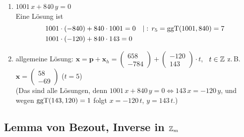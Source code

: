 \begin{loesung}
\begin{enumerate}
\item[(ii)] $1001\,x + 840\,y = 0$\\
Eine Lösung ist
\begin{align*}
&1001\cdot(-840) + 840\cdot 1001 = 0 \quad |:\, r_5 = \operatorname{ggT}(1001, 840) = 7\\
&1001\cdot(-120) + 840\cdot 143 = 0
\end{align*}
\item[(iii)] allgemeine Lösung: $\mathbf{x} = \mathbf{p} + \mathbf{x}_h = \begin{pmatrix}658\\-784\end{pmatrix} + \begin{pmatrix}-120\\143\end{pmatrix} \cdot t$, \ $t \in \mathbb{Z}$ \quad z.\,B. $\mathbf{x} = \begin{pmatrix}58\\-69\end{pmatrix}$ ($t = 5$)\\
(Das sind alle Lösungen, denn $1001\,x + 840\,y = 0 \Leftrightarrow 143\,x = -120\,y$, und wegen $\operatorname{ggT}(143, 120) = 1$ folgt $x = -120\,t$, $y = 143\,t$.)
\end{enumerate}
\end{loesung}

\subsection{Lemma von Bezout, Inverse in $\mathbb{Z}_{m}$}

